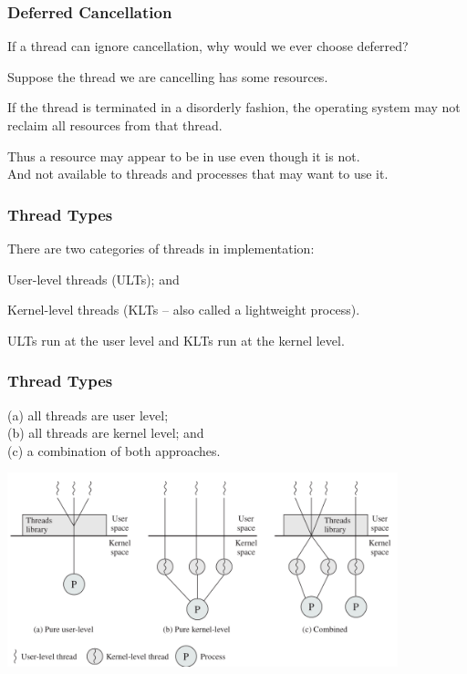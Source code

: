 \begin{frame}
\frametitle{Deferred Cancellation}

If a thread can ignore cancellation, why would we ever choose deferred? 

Suppose the thread we are cancelling has some resources. 

If the thread is terminated in a disorderly fashion, the operating system may not reclaim all resources from that thread. 

Thus a resource may appear to be in use even though it is not.\\
\quad And not available to threads and processes that may want to use it.

\end{frame}

\begin{frame}
\frametitle{Thread Types}

There are two categories of threads in implementation: 

\alert{User-level} threads (ULTs); and 

\alert{Kernel-level} threads (KLTs -- also called a lightweight process).

  ULTs run at the user level and KLTs run at the kernel level.

\end{frame}

\begin{frame}
\frametitle{Thread Types}
(a) all threads are user level;\\ (b) all threads are kernel level; and\\ (c) a combination of both approaches.

\begin{center}
	\includegraphics[width=0.85\textwidth]{images/thread-types.png}
\end{center}

\end{frame}

